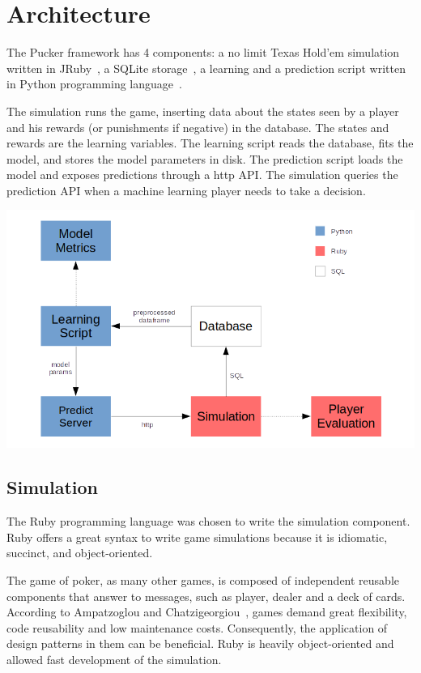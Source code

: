 \newpage

\chapter{Architecture}
\label{chap:architecture}

The Pucker framework has 4 components: a no limit Texas Hold’em simulation written in JRuby~\cite{jruby.org}, a SQLite storage~\cite{sqlite.org}, a learning and a prediction script written in Python programming language~\cite{python.org}.

The simulation runs the game, inserting data about the states seen by a player and his rewards (or punishments if negative) in the database. The states and rewards are the learning variables. The learning script reads the database, fits the model, and stores the model parameters in disk. The prediction script loads the model and exposes predictions through a http API. The simulation queries the prediction API when a machine learning player needs to take a decision.

\vspace{1cm}
\includegraphics[scale=2]{architecture}

\section{Simulation}
\label{sec:simulation}

The Ruby programming language was chosen to write the simulation component. Ruby offers a great syntax to write game simulations because it is idiomatic, succinct, and object-oriented.

The game of poker, as many other games, is composed of independent reusable components that answer to messages, such as player, dealer and a deck of cards. According to Ampatzoglou and Chatzigeorgiou~\cite{Ampatzoglou2007}, games demand great flexibility, code reusability and low maintenance costs. Consequently, the application of design patterns in them can be beneficial. Ruby is heavily object-oriented and allowed fast development of the simulation.

